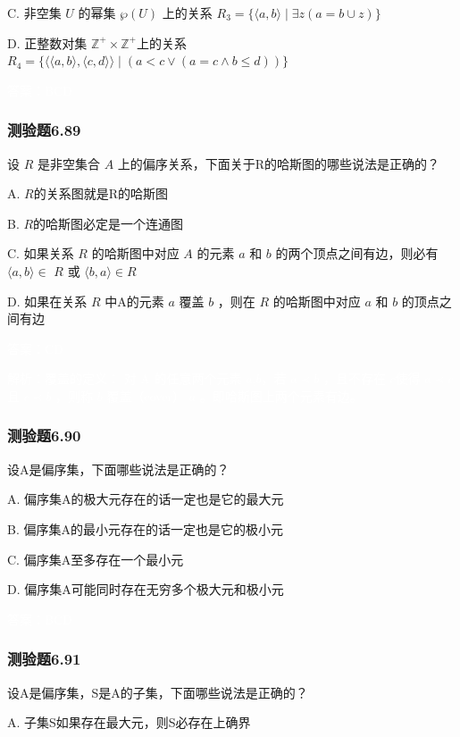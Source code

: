 \documentclass[UTF8, heading=true]{ctexart}
\begin{document}
C. 非空集 $U$ 的幂集 $\wp(U)$ 上的关系 $R_3=\{\langle a, b\rangle \mid \exists z(a=b \cup z)\}$

D.  正整数对集 $\mathbb{Z}^{+} \times \mathbb{Z}^{+}$上的关系 $R_4=\{\langle\langle a, b\rangle,\langle c, d\rangle\rangle \mid(a<c \vee(a=c \wedge b \leq d))\}$


\textcolor{white}{答案：BCD}

\subsubsection{测验题6.89}

设 $R$ 是非空集合 $A$ 上的偏序关系，下面关于R的哈斯图的哪些说法是正确的？

A. $R$的关系图就是R的哈斯图

B. $R$的哈斯图必定是一个连通图

C. 如果关系 $R$ 的哈斯图中对应 $A$ 的元素 $a$ 和 $b$ 的两个顶点之间有边，则必有 $\langle a, b\rangle \in$ $R$ 或 $\langle b, a\rangle \in R$

D.  如果在关系 $R$ 中A的元素 $a$ 覆盖 $b$ ，则在 $R$ 的哈斯图中对应 $a$ 和 $b$ 的顶点之间有边

\textcolor{white}{答案：CD}

\textcolor{white}{解析：覆盖的定义：
对 A 的任意两个元素 $a$,$ b $，若 $a \prec b$ ，且不存在 $c $使得 $a \prec c$ 且 $c \prec b$ ，则称 $b$ 覆盖（cover） $a$ 。即哈斯图上两个元素有边。}


\subsubsection{测验题6.90}

设A是偏序集，下面哪些说法是正确的？

A. 偏序集A的极大元存在的话一定也是它的最大元

B. 偏序集A的最小元存在的话一定也是它的极小元

C. 偏序集A至多存在一个最小元

D. 偏序集A可能同时存在无穷多个极大元和极小元

\textcolor{white}{答案：BCD}

\subsubsection{测验题6.91}

设A是偏序集，S是A的子集，下面哪些说法是正确的？

A. 子集S如果存在最大元，则S必存在上确界
\end{document}

